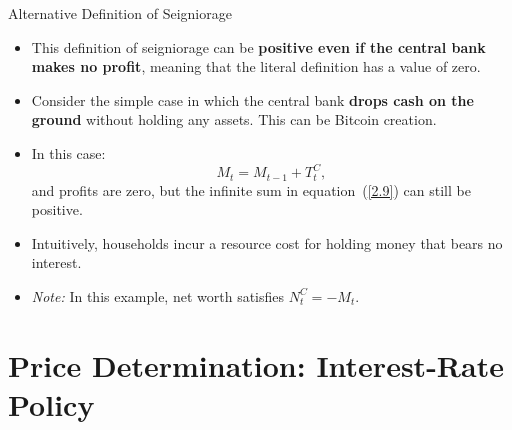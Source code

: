 \documentclass[11pt,aspectratio=169]{beamer}
\begin{document}
\begin{frame}{Alternative Definition of Seigniorage}

\begin{itemize}

    \item This definition of seigniorage can be \textbf{positive even if the central bank makes no profit}, meaning that the literal definition has a value of zero.

    \vspace{0.6em}

    \item Consider the simple case in which the central bank \textbf{drops cash on the ground} without holding any assets. This can be Bitcoin creation.

    \vspace{0.6em}

    \item In this case:
    \begin{equation*}
        M_t = M_{t-1} + T_t^C,
    \end{equation*}
    and profits are zero, but the infinite sum in equation~(\ref{2.9}) can still be positive.

    \vspace{0.6em}

    \item Intuitively, households incur a resource cost for holding money that bears no interest.

    \vspace{0.6em}

    \item \textit{Note:} In this example, net worth satisfies 
    $N_t^C = -M_t.$
\end{itemize}

\end{frame}




\section{Price Determination: Interest-Rate Policy}
\end{document}
